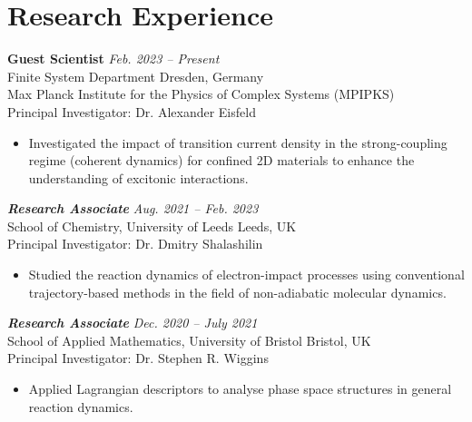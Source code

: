 \section{\sc Research Experience}





{\bf Guest Scientist} \hfill \textit{Feb. 2023 -- Present} \\
Finite System Department  \hfill Dresden, Germany \\
Max Planck Institute for the Physics of Complex Systems (MPIPKS) \\
Principal Investigator: Dr. Alexander Eisfeld\\
\vspace{-10pt}
\begin{itemize}
\setlength\itemsep{0em}
    \item Investigated the impact of transition current density in the strong-coupling regime (coherent dynamics) for confined 2D materials to enhance the understanding of excitonic interactions.
\end{itemize}

{\sl \bf Research Associate} \hfill \textit{Aug. 2021 -- Feb. 2023} \\
School of Chemistry, University of Leeds \hfill Leeds, UK\\
Principal Investigator: Dr. Dmitry Shalashilin \\
\vspace{-10pt}
\begin{itemize}
    \item Studied the reaction dynamics of electron-impact processes using conventional trajectory-based methods in the field of non-adiabatic molecular dynamics.
\end{itemize}

{\sl \bf Research Associate} \hfill \textit{Dec. 2020 -- July 2021} \\
School of Applied Mathematics, University of Bristol \hfill Bristol, UK\\
Principal Investigator: Dr. Stephen R. Wiggins \\
\vspace{-10pt}
\begin{itemize}
    \item Applied Lagrangian descriptors to analyse phase space structures in general reaction dynamics.
\end{itemize}


